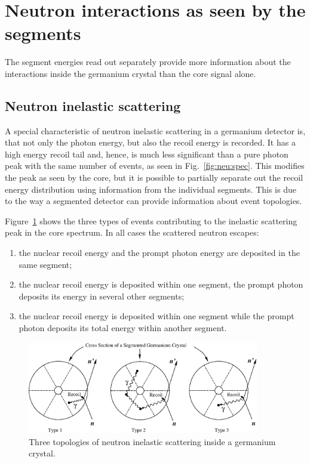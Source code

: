 \section{Neutron interactions as seen by the segments}
\label{sec:neu:seg}
The segment energies read out separately provide more information about the interactions inside the germanium crystal than the core signal alone.

\subsection{Neutron inelastic scattering}
A special characteristic of neutron inelastic scattering in a germanium detector is, that not only the photon energy, but also the recoil energy is recorded. It has a high energy recoil tail and, hence, is much less significant than a pure photon peak with the same number of events, as seen in Fig.~\ref{fig:neu:spec}. This modifies the peak as seen by the core, but it is possible to partially separate out the recoil energy distribution using information from the individual segments. This is due to the way a segmented detector can provide information about event topologies.

Figure~\ref{fig:neu:inel} shows the three types of events contributing to the inelastic scattering peak in the core spectrum. In all cases the scattered neutron escapes:
\begin{enumerate}
\item the nuclear recoil energy and the prompt photon energy are
  deposited in the same segment;
\item the nuclear recoil energy is deposited within one segment, the
  prompt photon deposits its energy in several other segments;
\item the nuclear recoil energy is deposited within one segment while
  the prompt photon deposits its total energy within another segment.
\end{enumerate}

\begin{figure}[tbhp]
  \centering
  \includegraphics[width=0.9\textwidth]{ine_1}
  \caption{Three topologies of neutron inelastic scattering inside a
    germanium crystal.}
  \label{fig:neu:inel}
\end{figure}

